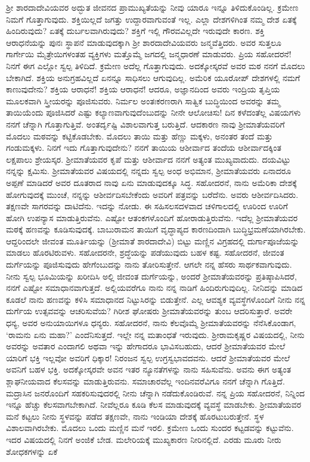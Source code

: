 ಶ‍್ರೀ ಶಾರದಾದೇವಿಯವರ ಅದ್ಭುತ ಜೀವನದ ಪ್ರಾಮುಖ್ಯತೆಯನ್ನು ನೀವು ಯಾರೂ ಇನ್ನೂ ತಿಳಿದುಕೊಂಡಿಲ್ಲ. ಕ್ರಮೇಣ ನಿಮಗೆ ಗೊತ್ತಾಗುವುದು. ಶಕ್ತಿಯಿಲ್ಲದೆ ಜಗತ್ತು ಉದ್ದಾರವಾಗುವಂತೆ ಇಲ್ಲ. ಎಲ್ಲಾ ದೇಶಗಳಿಗಿಂತ ನಮ್ಮ ದೇಶ ಏತಕ್ಕೆ ಹಿಂದಿರುವುದು? ಏತಕ್ಕೆ ದುರ್ಬಲವಾಗಿರುವುದು? ಶಕ್ತಿಗೆ ಇಲ್ಲಿ ಗೌರವವಿಲ್ಲದೇ ಇರುವುದೇ ಕಾರಣ. ಶಕ್ತಿ ಆರಾಧನೆಯನ್ನು ಪುನಃ ಸ್ಥಾಪನೆ ಮಾಡುವುದಕ್ಕಾಗಿ ಶ‍್ರೀ ಶಾರದಾದೇವಿಯವರು ಜನ್ಮವೆತ್ತಿದರು. ಅವರ ಸುತ್ತಲೂ ಗಾರ್ಗೇಯಿ ಮೈತ್ರೇಯಿಗಳಂತಹ ವ್ಯಕ್ತಿಗಳು ಮತ್ತೊಮ್ಮೆ ಜಗದಲ್ಲಿ ಜನ್ಮಧಾರಣೆ ಮಾಡುವರು. ಪ್ರಿಯ ಸಹೋದರನೆ! ನಿನಗೆ ಈಗ ಎಲ್ಲೋ ಸ್ವಲ್ಪ ತಿಳಿದಿದೆ. ಕ್ರಮೇಣ ಅದೆಲ್ಲ ಗೊತ್ತಾಗುವುದು. ಅದಕ್ಕೋಸ್ಕರವೆ ಅವರ ಮಠ ನನಗೆ ಮೊದಲು ಬೇಕಾಗಿದೆ. ಶಕ್ತಿಯ ಅನುಗ್ರಹವಿಲ್ಲದೆ ಏನನ್ನೂ ಸಾಧಿಸಲು ಆಗುವುದಿಲ್ಲ. ಅಮೆರಿಕ ಯೂರೋಪ್ ದೇಶಗಳಲ್ಲಿ ನಮಗೆ ಕಾಣುವುದೇನು? ಶಕ್ತಿಯ ಆರಾಧನೆ! ಶಕ್ತಿಯ ಆರಾಧನೆ! ಆದರೂ, ಅಜ್ಞಾನದಿಂದ ಅವರು ಇಂದ್ರಿಯ ತೃಪ್ತಿಯ ಮೂಲಕವಾಗಿ ಸ್ತ್ರೀಯರನ್ನು ಪೂಜಿಸುವರು. ನಿರ್ಮಲ ಅಂತಃಕರಣರಾಗಿ ಸಾತ್ವಿಕ ಬುದ್ಧಿಯಿಂದ ಅವರನ್ನು ತಮ್ಮ ತಾಯಿಯೆಂದು ಪೂಜಿಸಿದರೆ ಎಷ್ಟು ಕಲ್ಯಾಣವಾಗುವುದೆಂಬುದನ್ನು ನೀನೇ ಆಲೋಚಿಸು! ದಿನ ಕಳೆದಂತೆಲ್ಲ ವಿಷಯಗಳು ನನಗೆ ಚೆನ್ನಾಗಿ ಗೊತ್ತಾಗುತ್ತಿವೆ. ಅಂತರ್ದೃಷ್ಟಿ ವಿಶಾಲವಾಗುತ್ತ ಬರುತ್ತಿದೆ. ಆದಕಾರಣ ನಾವು ಶ‍್ರೀಮಾತೆಯವರಿಗೆ ಮೊದಲು ಮಠವನ್ನು ಕಟ್ಟಿಕೊಡಬೇಕು. ಮೊದಲು ತಾಯಿ ಮತ್ತು ಹೆಣ್ಣು ಮಕ್ಕಳು, ಅನಂತರ ತಂದೆ ಮತ್ತು ಗಂಡುಮಕ್ಕಳು. ನಿನಗೆ ಇದು ಗೊತ್ತಾಗುವುದೇನು? ನನಗೆ ತಾಯಿಯ ಆಶೀರ್ವಾದ ತಂದೆಯ ಆಶೀರ್ವಾದಕ್ಕಿಂತ ಲಕ್ಷಪಾಲು ಶ್ರೇಯಸ್ಕರ. ಶ‍್ರೀಮಾತೆಯವರ ಕೃಪೆ ಮತ್ತು ಆಶೀರ್ವಾದ ನನಗೆ ಅತ್ಯಂತ ಮುಖ್ಯವಾದುದು. ದಯವಿಟ್ಟು ನನ್ನನ್ನು ಕ್ಷಮಿಸು. ಶ‍್ರೀಮಾತೆಯವರ ವಿಷಯದಲ್ಲಿ ನನ್ನದು ಸ್ವಲ್ಪ ಅಂಧ ಅಭಿಮಾನ, ಶ‍್ರೀಮಾತೆಯವರು ಏನಾದರೂ ಅಪ್ಪಣೆ ಮಾಡಿದರೆ ಅವರ ದೂತರಾದ ನಾವು ಏನು ಮಾಡುವುದಕ್ಕೂ ಸಿದ್ಧ. ಸಹೋದರನೆ, ನಾನು ಅಮೆರಿಕಾ ದೇಶಕ್ಕೆ ಹೋಗುವುದಕ್ಕೆ ಮುಂಚೆ, ನನ್ನನ್ನು ಆಶೀರ್ವದಿಸಬೇಕೆಂದು ಅವರಿಗೆ ಪತ್ರವನ್ನು ಬರೆದೆನು. ಅವರು ಆಶೀರ್ವದಿಸಿದರು. ತಕ್ಷಣವೇ ಸಾಗರವನ್ನು ದಾಟಿದೆನು. ಇದನ್ನು ನೋಡು. ಈ ಸಹಿಸಲಸದಳವಾದ ಚಳಿಗಾಲದಲ್ಲಿ ಊರಿಂದ ಊರಿಗೆ ಹೋಗಿ ಉಪನ್ಯಾಸ ಮಾಡುತ್ತಿರುವೆನು. ಎಷ್ಟೋ ಆತಂಕಗಳೊಂದಿಗೆ ಹೋರಾಡುತ್ತಿರುವೆನು. ಇದೆಲ್ಲ ಶ‍್ರೀಮಾತೆಯವರ ಮಠಕ್ಕೆ ಹಣವನ್ನು ಕೂಡಿಸುವುದಕ್ಕೆ. ಬಾಬುರಾಮನ ತಾಯಿಗೆ ವೃದ್ಧಾಪ್ಯದ ಕಾರಣದಿಂದಾಗಿ ಬುದ್ಧಿಭ್ರಮಣೆಯಾಗಿರಬೇಕು. ಆದ್ದರಿಂದಲೇ ಜೀವಂತ ಮೂರ್ತಿಯನ್ನು (ಶ‍್ರೀಮಾತೆ ಶಾರದಾದೇವಿ) ಬಿಟ್ಟು ಮಣ್ಣಿನ ವಿಗ್ರಹದಲ್ಲಿ ದುರ್ಗಾಪೂಜೆಯನ್ನು ಮಾಡಲು ಹೊರಟಿರುವಳು. ಸಹೋದರನೇ, ಶ್ರದ್ಧೆಯನ್ನು ಪಡೆಯುವುದು ಬಹಳ ಕಷ್ಟ. ಸಹೋದರನೆ, ಜೀವಂತ ದುರ್ಗೆಯನ್ನು ಪೂಜಿಸುವುದು ಹೇಗೆಂಬುದನ್ನು ನಾನು ತೋರಿಸುತ್ತೇನೆ. ಆಗಲೇ ನನ್ನ ಹೆಸರು ಸಾರ್ಥಕವಾಗುವುದು. ನೀನು ಸ್ವಲ್ಪ ಭೂಮಿಯನ್ನು ಖರೀದಿಸಿ ಅಲ್ಲಿ ಜೀವಂತ ದುರ್ಗೆಯನ್ನು, ಅಂದರೆ  ಶ‍್ರೀಮಾತೆ\break ಯವರನ್ನು ಪ್ರತಿಷ್ಠಾಪಿಸಿದರೆ, ನನಗೆ ಎಷ್ಟೋ ಸಮಾಧಾನವಾಗುತ್ತದೆ. ಅಲ್ಲಿಯವರೆಗೂ ನಾನು ನನ್ನ ನಾಡಿಗೆ ಹಿಂದಿರುಗುವುದಿಲ್ಲ. ನೀನಿದನ್ನು ಮಾಡಿದ ಕೂಡಲೆ ನಾನು ಹಣವನ್ನು ಕಳಿಸಿ ಸಮಾಧಾನದ ನಿಟ್ಟುಸಿರನ್ನು ಬಿಡುತ್ತೇನೆ. ಎಲ್ಲ ಆವಶ್ಯಕ ವ್ಯವಸ್ಥೆಗಳೊಂದಿಗೆ ನೀನು ನನ್ನ ದುರ್ಗೆಯ ಉತ್ಸವವನ್ನು ಆಚರಿಸುವೆಯ? ಗಿರೀಶ ಘೋಷರು ಶ‍್ರೀಮಾತೆಯವರನ್ನು ತುಂಬ ಆದರಿಸುತ್ತಾರೆ. ಅವರೇ ಧನ್ಯ, ಅವರ ಅನುಯಾಯಿಗಳೂ ಧನ್ಯರು. ಸಹೋದರನೆ, ನಾನು ಕೆಲವೊಮ್ಮೆ ಶ‍್ರೀಮಾತೆಯವರನ್ನು ನೆನೆಸಿಕೊಂಡಾಗ, ‘ರಾಮನು ಏನು ಮಹಾ?’\enginline{-} ಎಂದೆನಿಸುತ್ತದೆ. ಇಲ್ಲೇ ನನ್ನ ಮತಾಂಧತೆ ಇರುವುದು. ಶ‍್ರೀರಾಮಕೃಷ್ಣರ ವಿಷಯದಲ್ಲಿ, ನೀನು ಅವರನ್ನು ಅವತಾರ ಎಂದಾಗಲಿ ಅಥವಾ ಇನ್ನು ಹೇಗಾದರೂ ಭಾವಿಸಬಹುದು, ಆದರೆ ಶ‍್ರೀಮಾತೆಯವರ ಮೇಲೆ ಯಾರಿಗೆ ಭಕ್ತಿ ಇಲ್ಲವೋ ಅವರಿಗೆ ಧಿಕ್ಕಾರ! ನಿರಂಜನ ಸ್ವಲ್ಪ ಉಗ್ರಸ್ವಭಾವದವನು. ಆದರೆ ಶ‍್ರೀಮಾತೆಯವರ ಮೇಲೆ ಅವನಿಗೆ ಬಹಳ ಭಕ್ತಿ. ಅದಕ್ಕೋಸ್ಕರವೇ ಅವನ ಇತರ ನ್ಯೂನತೆಗಳನ್ನು ನಾನು ಸಹಿಸುವೆನು. ಅವನು ಈಗ ಅತ್ಯಂತ ಶ್ಲಾಘನೀಯವಾದ ಕೆಲಸವನ್ನು ಮಾಡುತ್ತಿರುವನು. ಸಮಾಚಾರವೆಲ್ಲ ಇಂದಿನವರೆವಿಗೂ ನನಗೆ ಚೆನ್ನಾಗಿ ಗೊತ್ತಿದೆ. ಮದ್ರಾಸಿನ ಜನರೊಂದಿಗೆ ಸಹಕರಿಸುವುದರಲ್ಲಿ ನೀನು ಚೆನ್ನಾಗಿ ನಡೆದುಕೊಂಡಿರುವೆ. ನನ್ನ ಪ್ರಿಯ ಸಹೋದರನೆ, ನಿನ್ನಿಂದ ಇನ್ನೂ ಹೆಚ್ಚು ಕೆಲಸವಾಗಬೇಕಾಗಿದೆ. ನೀವೆಲ್ಲರೂ ಕೂಡಿ ಕೆಲಸ ಮಾಡುವುದಕ್ಕೆ ವ್ಯವಸ್ಥೆ ಮಾಡಬೇಕು. ಶ‍್ರೀಮಾತೆಯವರ ಮನೆ ಕಟ್ಟಲು ನೀನು ಸ್ಥಳವನ್ನು ಪಡೆದ ತಕ್ಷಣವೇ, ನಾನು ಇಂಡಿಯಾ ದೇಶಕ್ಕೆ ಹೊರಟುಬರುತ್ತೇನೆ. ಸ್ಥಳ ವಿಶಾಲವಾಗಿರಬೇಕು. ಮೊದಲು ಒಂದು ಮಣ್ಣಿನ ಮನೆ ಇರಲಿ. ಕ್ರಮೇಣ ಒಂದು ಸುಂದರ ಕಟ್ಟಡವನ್ನು ಕಟ್ಟುವೆನು. ಇದರ ವಿಷಯದಲ್ಲಿ ನಿನಗೆ ಅಂಜಿಕೆ ಬೇಡ. ಮಲೇರಿಯಕ್ಕೆ ಮುಖ್ಯಕಾರಣ ನೀರಿನಲ್ಲಿದೆ. ಎರಡು ಮೂರು ನೀರು ಶೋಧಕಗಳನ್ನು ಏಕೆ 